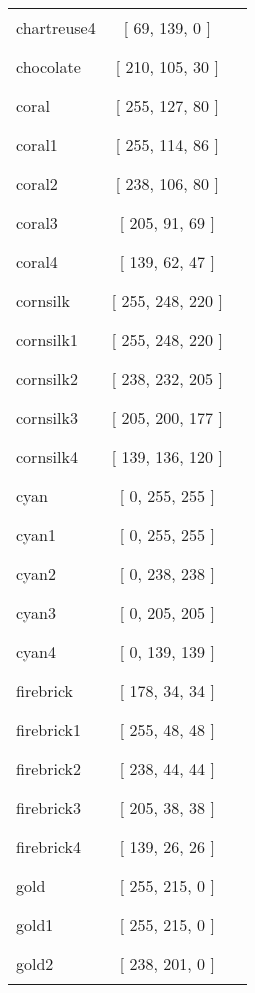 \begin{tabular}{|l|c|c|}
chartreuse4 & [ 69, 139, 0 ] & \color{chartreuse4} \rule{1cm}{1.5ex}\\
chocolate & [ 210, 105, 30 ] & \color{chocolate} \rule{1cm}{1.5ex}\\
coral & [ 255, 127, 80 ] & \color{coral} \rule{1cm}{1.5ex}\\
coral1 & [ 255, 114, 86 ] & \color{coral1} \rule{1cm}{1.5ex}\\
coral2 & [ 238, 106, 80 ] & \color{coral2} \rule{1cm}{1.5ex}\\
coral3 & [ 205, 91, 69 ] & \color{coral3} \rule{1cm}{1.5ex}\\
coral4 & [ 139, 62, 47 ] & \color{coral4} \rule{1cm}{1.5ex}\\
cornsilk & [ 255, 248, 220 ] & \color{cornsilk} \rule{1cm}{1.5ex}\\
cornsilk1 & [ 255, 248, 220 ] & \color{cornsilk1} \rule{1cm}{1.5ex}\\
cornsilk2 & [ 238, 232, 205 ] & \color{cornsilk2} \rule{1cm}{1.5ex}\\
cornsilk3 & [ 205, 200, 177 ] & \color{cornsilk3} \rule{1cm}{1.5ex}\\
cornsilk4 & [ 139, 136, 120 ] & \color{cornsilk4} \rule{1cm}{1.5ex}\\
cyan & [ 0, 255, 255 ] & \color{cyan} \rule{1cm}{1.5ex}\\
cyan1 & [ 0, 255, 255 ] & \color{cyan1} \rule{1cm}{1.5ex}\\
cyan2 & [ 0, 238, 238 ] & \color{cyan2} \rule{1cm}{1.5ex}\\
cyan3 & [ 0, 205, 205 ] & \color{cyan3} \rule{1cm}{1.5ex}\\
cyan4 & [ 0, 139, 139 ] & \color{cyan4} \rule{1cm}{1.5ex}\\
firebrick & [ 178, 34, 34 ] & \color{firebrick} \rule{1cm}{1.5ex}\\
firebrick1 & [ 255, 48, 48 ] & \color{firebrick1} \rule{1cm}{1.5ex}\\
firebrick2 & [ 238, 44, 44 ] & \color{firebrick2} \rule{1cm}{1.5ex}\\
firebrick3 & [ 205, 38, 38 ] & \color{firebrick3} \rule{1cm}{1.5ex}\\
firebrick4 & [ 139, 26, 26 ] & \color{firebrick4} \rule{1cm}{1.5ex}\\
gold & [ 255, 215, 0 ] & \color{gold} \rule{1cm}{1.5ex}\\
gold1 & [ 255, 215, 0 ] & \color{gold1} \rule{1cm}{1.5ex}\\
gold2 & [ 238, 201, 0 ] & \color{gold2} \rule{1cm}{1.5ex}\\

\end{tabular}
